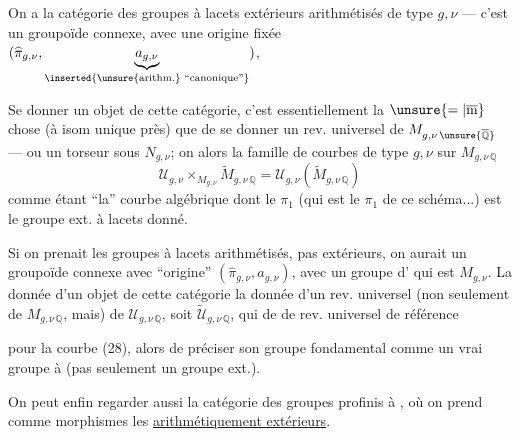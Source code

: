 On a la catégorie des groupes à lacets  extérieurs arithmétisés de type $g,\nu$ --- c'est un groupoïde connexe, avec une origine fixée $(\widehat{\pi}_{g,\nu},\underbrace{a_{g,\nu}}_{\inserted{\text{\unsure{arithm.} ``canonique''}}})$,


Se donner un objet de cette catégorie, c'est essentiellement la $\unsure{=|\overline{\mathrm m}}$ chose (à isom unique près) que de se donner un rev. universel  de $M_{g,\nu\,\unsure{\overline{\mathbb Q}}}$ --- ou un torseur sous $N_{g,\nu}$; on  alors la famille de courbes de type $g,\nu$ sur $M_{g,\nu\,\mathbb Q}$
\[
 \mathcal U_{g,\nu}\times_{M_{g,\nu}}\widetilde M_{g,\nu\,\mathbb Q}
 =\mathcal U_{g,\nu}(\widetilde M_{g,\nu\,\mathbb Q})
\tag{28}
\]
comme étant ``la'' courbe algébrique dont le $\pi_1$  (qui est  le $\pi_1$ de ce schéma...) est le groupe ext. à lacets donné.

Si on prenait les groupes à lacets arithmétisés, pas extérieurs, on aurait  un groupoïde connexe avec ``origine'' $(\widehat{\pi}_{g,\nu},a_{g,\nu})$, avec un groupe d' qui est $M_{g,\nu}$. La donnée d'un objet de cette catégorie   la donnée d'un rev. universel (non seulement de $M_{g,\nu\,\mathbb Q}$, mais) de $\mathcal U_{g,\nu\,\mathbb Q}$, soit $\widetilde{\mathcal U}_{g,\nu\,\mathbb Q}$, qui    de  de rev. universel de référence


pour la courbe  (28),  alors de préciser son groupe fondamental comme un vrai groupe à  (pas seulement un groupe ext.).

On peut enfin regarder aussi la catégorie des groupes profinis à  , où on prend comme morphismes les \uline{ arithmétiquement extérieurs}.


